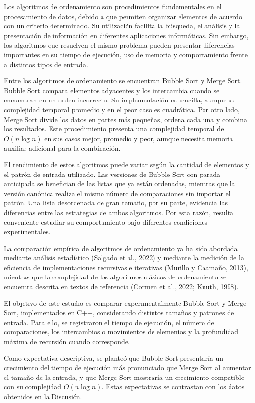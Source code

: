 \documentclass[12pt,a4paper,twocolumn]{article}
\begin{document}
Los algoritmos de ordenamiento son procedimientos fundamentales
en el procesamiento de datos, debido a que permiten organizar
elementos de acuerdo con un criterio determinado. Su utilización
facilita la búsqueda, el análisis y la presentación de información
en diferentes aplicaciones informáticas. Sin embargo, los
algoritmos que resuelven el mismo problema pueden presentar
diferencias importantes en su tiempo de ejecución, uso de memoria
y comportamiento frente a distintos tipos de entrada.
 
Entre los algoritmos de ordenamiento se encuentran Bubble Sort
y Merge Sort. Bubble Sort compara elementos adyacentes y los
intercambia cuando se encuentran en un orden incorrecto. Su
implementación es sencilla, aunque su complejidad temporal
promedio y en el peor caso es cuadrática. Por otro lado,
Merge Sort divide los datos en partes más pequeñas, ordena
cada una y combina los resultados. Este procedimiento presenta
una complejidad temporal de $O(n\log n)$ en sus casos mejor,
promedio y peor, aunque necesita memoria auxiliar adicional
para la combinación.
 
El rendimiento de estos algoritmos puede variar según la cantidad
de elementos y el patrón de entrada utilizado. Las versiones de
Bubble Sort con parada anticipada se benefician de las listas que
ya están ordenadas, mientras que la versión canónica realiza el
mismo número de comparaciones sin importar el patrón. Una lista
desordenada de gran tamaño, por su parte, evidencia las diferencias
entre las estrategias de ambos algoritmos. Por esta razón, resulta
conveniente estudiar su comportamiento bajo diferentes condiciones
experimentales.
 
La comparación empírica de algoritmos de ordenamiento ya ha sido
abordada mediante análisis estadístico (Salgado et al., 2022) y
mediante la medición de la eficiencia de implementaciones recursivas
e iterativas (Murillo y Caamaño, 2013), mientras que la complejidad
de los algoritmos clásicos de ordenamiento se encuentra descrita en
textos de referencia (Cormen et al., 2022; Knuth, 1998).
 
El objetivo de este estudio es comparar experimentalmente
Bubble Sort y Merge Sort, implementados en C++, considerando
distintos tamaños y patrones de entrada. Para ello, se registraron
el tiempo de ejecución, el número de comparaciones, los intercambios
o movimientos de elementos y la profundidad máxima de recursión
cuando corresponde.
 
Como expectativa descriptiva, se planteó que Bubble Sort
presentaría un crecimiento del tiempo de ejecución más pronunciado
que Merge Sort al aumentar el tamaño de la entrada, y que Merge Sort
mostraría un crecimiento compatible con su complejidad
$O(n\log n)$. Estas expectativas se contrastan con los datos
obtenidos en la Discusión.
 
\end{document}

